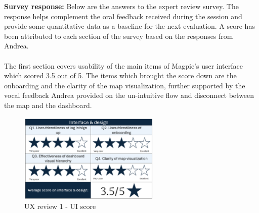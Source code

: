 \noindent\textbf{Survey response: }
Below are the answers to the expert review survey. The response helps complement the oral feedback received during the session and provide some quantitative data as a baseline for the next evaluation. A score has been attributed to each section of the survey based on the responses from Andrea.\\ \\
The first section covers usability of the main items of Magpie's user interface which scored \underline{3.5 out of 5}. The items which brought the score down are the onboarding and the clarity of the map visualization, further supported by the vocal feedback Andrea provided on the un-intuitive flow and disconnect between the map and the dashboard.\\
\begin{figure}[h!]
    \centering
    \includegraphics[width=0.6\textwidth]{images/ux-survey1-ui.png}
    \caption{UX review 1 - UI score}
\end{figure}

